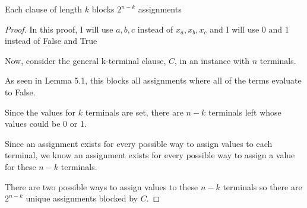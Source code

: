 \documentclass[manuscript]{acmart}
\begin{document}
    \begin{lemma}
        Each clause of length $k$ blocks $2^{n-k}$ assignments
    \end{lemma}
    \begin{proof}
        In this proof, I will use $a, b, c$ instead of $x_a, x_b, x_c$ and
        I will use 0 and 1 instead of False and True

        Now, consider the general k-terminal clause, $C$, in an instance with
        $n$ terminals.

        As seen in Lemma 5.1, this blocks all assignments where all of the terms
        evaluate to False.

        Since the values for $k$ terminals are set, there are $n-k$ terminals left
        whose values could be 0 or 1.

        Since an assignment exists for every possible way to assign values to
        each terminal, we know an assignment exists for every possible way to
        assign a value for these $n-k$ terminals.

        There are two possible ways to assign values to these $n-k$ terminals
        so there are $2^{n-k}$ unique assignments blocked by $C$.
    \end{proof}




\end{document}
